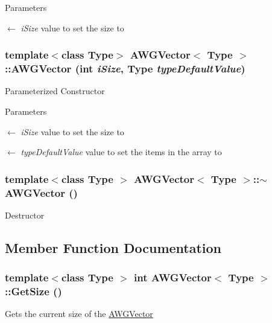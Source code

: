 \begin{DoxyParams}{Parameters}
\item[\mbox{$\leftarrow$} {\em iSize}]value to set the size to \end{DoxyParams}
\hypertarget{classAWGVector_a22692b3e4189d78d13b5828264374b8e}{
\subsubsection[{AWGVector}]{\setlength{\rightskip}{0pt plus 5cm}template$<$class Type$>$ {\bf AWGVector}$<$ Type $>$::{\bf AWGVector} (int {\em iSize}, \/  Type {\em typeDefaultValue})}}
\label{classAWGVector_a22692b3e4189d78d13b5828264374b8e}
Parameterized Constructor


\begin{DoxyParams}{Parameters}
\item[\mbox{$\leftarrow$} {\em iSize}]value to set the size to \item[\mbox{$\leftarrow$} {\em typeDefaultValue}]value to set the items in the array to \end{DoxyParams}
\hypertarget{classAWGVector_a0ac70e66f5a0b79ec3eeca0ebd24c566}{
\subsubsection[{$\sim$AWGVector}]{\setlength{\rightskip}{0pt plus 5cm}template$<$class Type $>$ {\bf AWGVector}$<$ Type $>$::$\sim${\bf AWGVector} ()}}
\label{classAWGVector_a0ac70e66f5a0b79ec3eeca0ebd24c566}
Destructor 

\subsection{Member Function Documentation}
\hypertarget{classAWGVector_abc39a471c9556aa62b9f19f06e399777}{
\subsubsection[{GetSize}]{\setlength{\rightskip}{0pt plus 5cm}template$<$class Type $>$ int {\bf AWGVector}$<$ Type $>$::GetSize ()}}
\label{classAWGVector_abc39a471c9556aa62b9f19f06e399777}
Gets the current size of the \hyperlink{classAWGVector}{AWGVector}


